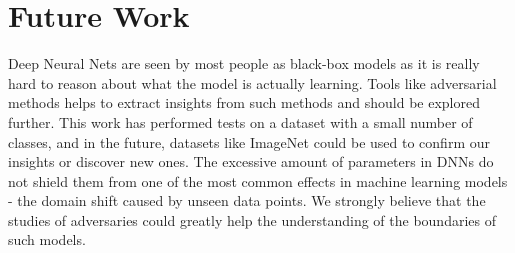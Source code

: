 \documentclass[runningheads,a4paper]{llncs}
\begin{document}
\section{Future Work}
Deep Neural Nets are seen by most people as black-box models as it is really hard to reason about what the model is actually learning. Tools like adversarial methods helps to extract insights from such methods and should be explored further. This work has performed tests on a dataset with a small number of classes, and in the future, datasets like ImageNet could be used to confirm our insights or discover new ones. The excessive amount of parameters in DNNs do not shield them from one of the most common effects in machine learning models - the domain shift caused by unseen data points. We strongly believe that the studies of adversaries could greatly help the understanding of the boundaries of such models.


 

\end{document}
